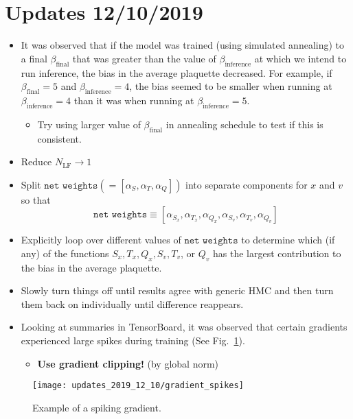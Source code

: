 \section{Updates 12/10/2019}%
\label{sec:updates2019_12_10}
%
\begin{itemize}
  \item It was observed that if the model was trained (using simulated
    annealing) to a final $\beta_{\mathrm{final}}$ that was greater than the
    value of $\beta_{\mathrm{inference}}$ at which we intend to run inference,
    the bias in the average plaquette decreased. For example, if
    $\beta_{\mathrm{final}} = 5$ and $\beta_{\mathrm{inference}} = 4$, the bias
    seemed to be smaller when running at $\beta_{\mathrm{inference}} = 4$ than
    it was when running at $\beta_{\mathrm{inference}} = 5$.
    \begin{itemize}
      \item Try using larger value of $\beta_{\mathrm{final}}$ in annealing
        schedule to test if this is consistent.
    \end{itemize}
  \item Reduce $N_{\mathrm{LF}} \rightarrow 1$
  \item Split $\texttt{net weights}(= [\alpha_{S}, \alpha_{T}, \alpha_{Q}])$
    into separate components for $x$ and $v$ so that 
    \begin{equation}
      \texttt{net weights} \equiv [\alpha_{S_x}, \alpha_{T_x}, \alpha_{Q_x},
      \alpha_{S_v}, \alpha_{T_v}, \alpha_{Q_v}]
    \end{equation}
  \item Explicitly loop over different values of $\texttt{net weights}$ to
    determine which (if any) of the functions $S_x, T_x, Q_x, S_v, T_v$, or
    $Q_v$ has the largest contribution to the bias in the average plaquette.
  \item Slowly turn things off until results agree with generic HMC and then
    turn them back on individually until difference reappears. 
  \item Looking at summaries in TensorBoard, it was observed that certain
    gradients experienced large spikes during training
    (See Fig.~\ref{fig:gradient_spikes}).
    \begin{itemize}
      \item \textbf{Use gradient clipping!} (by global norm)
    \end{itemize}
\end{itemize}
%
\begin{figure}%
  \centering
  \texttt{[image: updates\_2019\_12\_10/gradient\_spikes]}%
  \caption{Example of a spiking gradient.}%
  \label{fig:gradient_spikes}
\end{figure}
